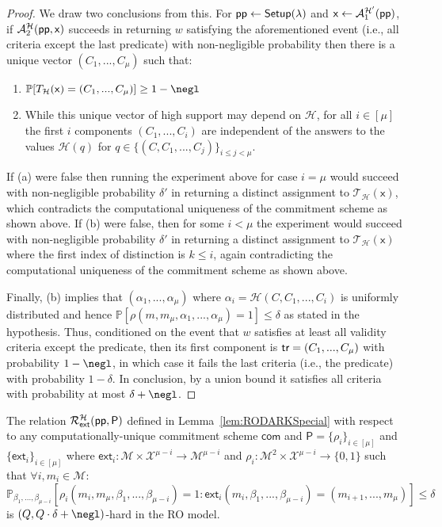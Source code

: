 \begin{proof}
We draw two conclusions from this. For $\textsf{pp} \gets \textsf{{Setup}}(\lambda)$ and $\mathsf{x} \gets \mathcal{A}_1^{\mathcal{H}'}(\textsf{pp})$, if $\mathcal{A}_2^\mathcal{H}(\textsf{pp}, \mathsf{x})$ succeeds in returning $w$ satisfying the aforementioned event (i.e., all criteria except the last predicate) with non-negligible probability then there is a unique vector $(C_1,...,C_\mu)$ such that: 
\begin{enumerate}[label=(\alph*)]
	\item $\mathbb{P}[T_{\mathcal{H}}(\mathsf{x}) = (C_1,...,C_\mu)] \geq 1 - \negl$
	\item While this unique vector of high support may depend on $\mathcal{H}$, for all $i \in [\mu]$ the first $i$ components $(C_1,...,C_i)$ are independent of the answers to the values $\mathcal{H}(q)$ for $q \in \{(C, C_1,...,C_j)\}_{i \leq j < \mu}$. 
\end{enumerate}
 If (a) were false then running the experiment above for case $i = \mu$ would succeed with non-negligible probability $\delta'$ in returning a distinct assignment to $\mathcal{T}_\mathcal{H}(\mathsf{x})$, which contradicts the computational uniqueness of the commitment scheme as shown above. If (b) were false, then for some $i < \mu$ the experiment would succeed with non-negligible probability $\delta'$ in returning a distinct assignment to $\mathcal{T}_\mathcal{H}(\mathsf{x})$ where the first index of distinction is $k \leq i$, again contradicting the computational uniqueness of the commitment scheme as shown above. 
 
 Finally, (b) implies that $(\alpha_1,...,\alpha_\mu)$ where $\alpha_i = \mathcal{H}(C,C_1,...,C_i)$ is uniformly distributed and hence $\mathbb{P}[\rho(m,m_\mu,\alpha_1,...,\alpha_\mu) = 1] \leq \delta$ as stated in the hypothesis. Thus, conditioned on the event that $w$ satisfies at least all validity criteria except the predicate, then its first component is $\textsf{{tr}} = (C_1,...,C_\mu)$ with probability $1-\negl$, in which case it fails the last criteria (i.e., the predicate) with probability $1-\delta$. In conclusion, by a union bound it satisfies all criteria with probability at most $\delta + \negl$. \end{proof}


\begin{lemma} 
The relation $\mathcal{R}^{\mathcal{H}}_\textsf{ext}(\textsf{pp}, \textsf{P})$ defined in Lemma~\ref{lem:RODARKSpecial} with respect to any computationally-unique commitment scheme $\mathsf{com}$ and $\textsf{P} = \{\rho_i\}_{i \in [\mu]}$ and $\{ \textsf{ext}_i\}_{i \in [\mu]}$ where $\textsf{ext}_i: \mathcal{M} \times \mathcal{X}^{\mu - i} \rightarrow \mathcal{M}^{\mu - i}$ and $\rho_i: \mathcal{M}^2 \times \mathcal{X}^{\mu - i} \rightarrow \{0,1\}$ such that $\forall i, m_i \in \mathcal{M}$: 
$$\mathbb{P}_{\beta_1,...,\beta_{\mu - i}}[\rho_i(m_i, m_\mu, \beta_1,...,\beta_{\mu - i}) = 1: \textsf{ext}_i(m_i, \beta_1,...,\beta_{\mu - i}) = (m_{i+1},...,m_\mu)] \leq \delta $$
is $(Q, Q \cdot \delta + \negl)$-hard in the RO model. 
\end{lemma}
\fi 


